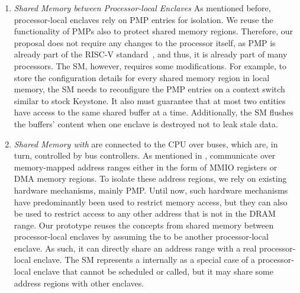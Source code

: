 \begin{enumerate}
\item\emph{Shared Memory between Processor-local Enclaves}
As mentioned before, processor-local enclaves rely on PMP entries for isolation. We reuse the functionality of PMPs also to protect shared memory regions. Therefore, our proposal does not require any changes to the processor itself, as PMP is already part of the RISC-V standard~\cite{riscv2019privspec}, and thus, it is already part of many processors. The SM, however, requires some modifications. For example, to store the configuration details for every shared memory region in local memory, the SM needs to reconfigure the PMP entries on a context switch similar to stock Keystone. It also must guarantee that at most two entities have access to the same shared buffer at a time. Additionally, the SM flushes the buffers' content when one enclave is destroyed not to leak stale data. 


\item\emph{Shared Memory with \sphw} \Sphw are connected to the CPU over buses, which are, in turn, controlled by bus controllers. As mentioned in , \sphw communicate over memory-mapped address ranges either in the form of MMIO registers or DMA memory regions. To isolate these address regions, we rely on existing hardware mechanisms, mainly PMP. Until now, such hardware mechanisms have predominantly been used to restrict memory access, but they can also be used to restrict access to any other address that is not in the DRAM range. Our prototype reuses the concepts from shared memory between processor-local enclaves by assuming the \sphw to be another processor-local enclave. As such, it can directly share an address range with a real processor-local enclave. The SM represents a \sphw internally as a special case of a processor-local enclave that cannot be scheduled or called, but it may share some address regions with other enclaves. 

\end{enumerate}

%      


